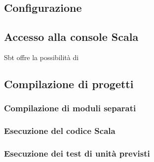 \documentclass{scalatekids-article}
\begin{document}
\subsection{Configurazione}

\subsection{Accesso alla console Scala}

Sbt offre la possibilità di

\subsection{Compilazione di progetti}

\subsubsection{Compilazione di moduli separati}

\subsubsection{Esecuzione del codice Scala}

\subsubsection{Esecuzione dei test di unità previsti}

\listoffigures
\end{document}
